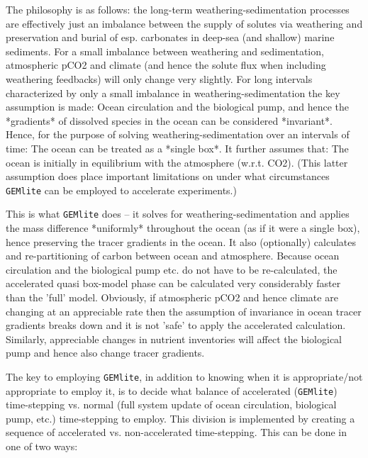 \documentclass[11pt,fleqn]{book} %
\begin{document}
The philosophy is as follows: the long-term weathering-sedimentation processes are effectively just an imbalance between the supply of solutes via weathering and preservation and burial of esp. carbonates in deep-sea (and shallow) marine sediments. For a small imbalance between weathering and sedimentation, atmospheric pCO2 and climate (and hence the solute flux when including weathering feedbacks) will only change very slightly. For long intervals characterized by only a small imbalance in weathering-sedimentation the key assumption is made:
Ocean circulation and the biological pump, and hence the *gradients* of dissolved species in the ocean can be considered *invariant*.
Hence, for the purpose of solving weathering-sedimentation over an intervals of time:
The ocean can be treated as a *single box*.
It further assumes that:
The ocean is initially in equilibrium with the atmosphere (w.r.t. CO2).
(This latter assumption does place important limitations on under what circumstances \texttt{GEMlite} can be employed to accelerate experiments.)

This is what \texttt{GEMlite} does -- it solves for weathering-sedimentation and applies the mass difference *uniformly* throughout the ocean (as if it were a single box), hence preserving the tracer gradients in the ocean. It also (optionally) calculates and re-partitioning of carbon between ocean and atmosphere. Because ocean circulation and the biological pump etc. do not have to be re-calculated, the accelerated quasi box-model phase can be calculated very considerably faster than the 'full' model.
Obviously, if atmospheric pCO2 and hence climate are changing at an appreciable rate then the assumption of invariance in ocean tracer gradients breaks down and it is not 'safe' to apply the accelerated calculation. Similarly, appreciable changes in nutrient inventories will affect the biological pump and hence also change tracer gradients.

The key to employing \texttt{GEMlite}, in addition to knowing when it is appropriate/not appropriate to employ it, is to decide what balance of accelerated (\texttt{GEMlite}) time-stepping vs. normal (full system update of ocean circulation, biological pump, etc.) time-stepping to employ. This division is implemented by creating a sequence of accelerated vs. non-accelerated time-stepping. This can be done in one of two ways:
\end{document}
